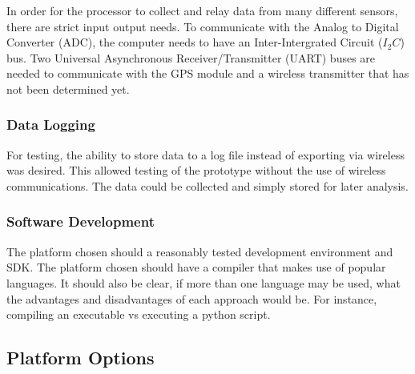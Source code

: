 In order for the processor to collect and relay data from many different sensors, there are strict input output needs. To communicate with the Analog to Digital Converter (ADC), the computer needs to have an Inter-Intergrated Circuit ($I_2C$) bus. Two Universal Asynchronous Receiver/Transmitter (UART) buses are needed to communicate with the GPS module and a wireless transmitter that has not been determined yet.

\subsubsection{Data Logging}

For testing, the ability to store data to a log file instead of exporting via wireless was desired. This allowed testing of the prototype without the use of wireless communications. The data could be collected and simply stored for later analysis. 

\subsubsection{Software Development}

The platform chosen should a reasonably tested development environment and SDK. The platform chosen should have a compiler that makes use of popular languages. It should also be clear, if more than one language may be used, what the advantages and disadvantages of each approach would be. For instance, compiling an executable vs executing a python script. 

\subsection{Platform Options}


